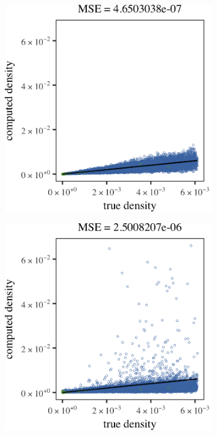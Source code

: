 		\begin{figure}[!ht]
			\centering
			\begin{subfigure}{0.6\columnwidth}
				\centering
				\includegraphics[width=\textwidth]{4/img/noOutliers/results_baakman_1_60000_mbe_silverman_no_outliers.png}
				\caption{\mbe}
				\label{fig:results:baakman1:noOutliers:mbe}
			\end{subfigure}
			\begin{subfigure}{0.6\columnwidth}
				\centering
				\includegraphics[width=\textwidth]{4/img/noOutliers/results_baakman_1_60000_sambe_silverman_no_outliers.png}

\end{subfigure}
\end{figure}
